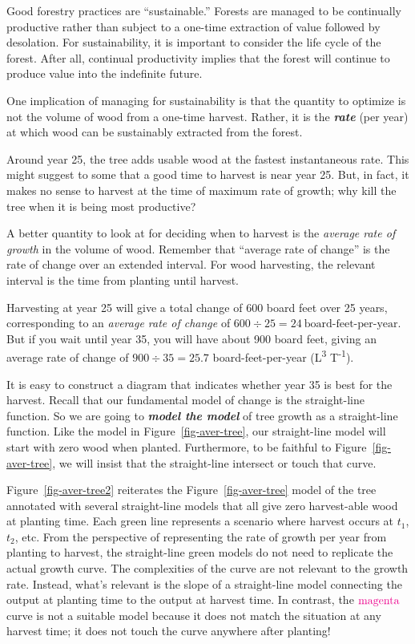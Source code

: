\documentclass[
  letterpaper,
  DIV=11,
  numbers=noendperiod,
  oneside]{scrreprt}
\begin{document}
Good forestry practices are ``sustainable.'' Forests are managed to be
continually productive rather than subject to a one-time extraction of
value followed by desolation. For sustainability, it is important to
consider the life cycle of the forest. After all, continual productivity
implies that the forest will continue to produce value into the
indefinite future.

One implication of managing for sustainability is that the quantity to
optimize is not the volume of wood from a one-time harvest. Rather, it
is the \textbf{\emph{rate}} (per year) at which wood can be sustainably
extracted from the forest.

Around year 25, the tree adds usable wood at the fastest instantaneous
rate. This might suggest to some that a good time to harvest is near
year 25. But, in fact, it makes no sense to harvest at the time of
maximum rate of growth; why kill the tree when it is being most
productive?

A better quantity to look at for deciding when to harvest is the
\emph{average rate of growth} in the volume of wood. Remember that
``average rate of change'' is the rate of change over an extended
interval. For wood harvesting, the relevant interval is the time from
planting until harvest.

Harvesting at year 25 will give a total change of 600 board feet over 25
years, corresponding to an \emph{average rate of change} of
\(600 \div 25 = 24\ \text{board-feet-per-year}\). But if you wait until
year 35, you will have about 900 board feet, giving an average rate of
change of \(900 \div 35 = 25.7\) board-feet-per-year
(L\textsuperscript{3} T\textsuperscript{-1}).

It is easy to construct a diagram that indicates whether year 35 is best
for the harvest. Recall that our fundamental model of change is the
straight-line function. So we are going to \textbf{\emph{model the
model}} of tree growth as a straight-line function. Like the model in
Figure~\ref{fig-aver-tree}, our straight-line model will start with zero
wood when planted. Furthermore, to be faithful to
Figure~\ref{fig-aver-tree}, we will insist that the straight-line
intersect or touch that curve.

Figure~\ref{fig-aver-tree2} reiterates the Figure~\ref{fig-aver-tree}
model of the tree annotated with several straight-line models that all
give zero harvest-able wood at planting time. Each green line represents
a scenario where harvest occurs at \(t_1\), \(t_2\), etc. From the
perspective of representing the rate of growth per year from planting to
harvest, the straight-line green models do not need to replicate the
actual growth curve. The complexities of the curve are not relevant to
the growth rate. Instead, what's relevant is the slope of a
straight-line model connecting the output at planting time to the output
at harvest time. In contrast, the \(\color{magenta}{\text{magenta}}\)
curve is not a suitable model because it does not match the situation at
any harvest time; it does not touch the curve anywhere after planting!
\end{document}
